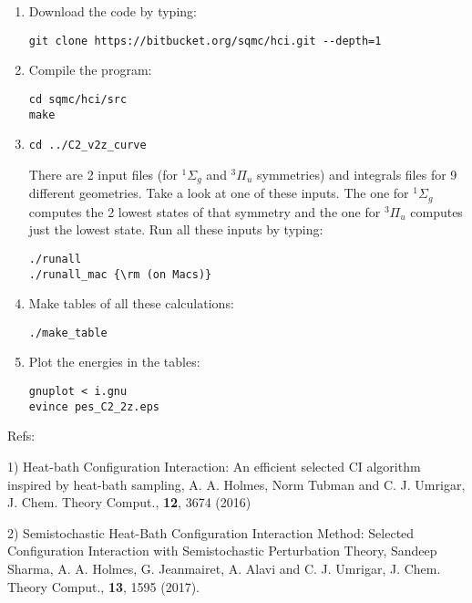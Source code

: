 \documentclass[12pt,aps,prb,groupedaddress,amsmath,amssymb]{revtex4-1}
\begin{document}
\begin{enumerate}
\item Download the code by typing:\vspace{-5mm}
\begin{verbatim}
git clone https://bitbucket.org/sqmc/hci.git --depth=1
\end{verbatim}
\item
Compile the program:\vspace{-5mm}
\begin{verbatim}
cd sqmc/hci/src
make
\end{verbatim}
\item
\begin{verbatim}
cd ../C2_v2z_curve
\end{verbatim}
There are 2 input files (for $^1\Sigma_g$ and $^3\Pi_u$ symmetries) and integrals files for 9 different geometries.  Take a look at one of these inputs.
The one for $^1\Sigma_g$ computes the 2 lowest states of that symmetry and the one for $^3\Pi_u$ computes just the lowest state.
Run all these inputs by typing:
\begin{verbatim}
./runall
./runall_mac {\rm (on Macs)}
\end{verbatim}
\item Make tables of all these calculations:\vspace{-5mm}
\begin{verbatim}
./make_table
\end{verbatim}
\item Plot the energies in the tables:\vspace{-5mm}
\begin{verbatim}
gnuplot < i.gnu
evince pes_C2_2z.eps
\end{verbatim}
\end{enumerate}

\vskip 9mm
Refs:
\small


1) Heat-bath Configuration Interaction: An efficient selected CI algorithm inspired by heat-bath sampling,
A. A. Holmes, Norm Tubman and C. J. Umrigar, J. Chem. Theory Comput., {\bf 12}, 3674 (2016)

2) Semistochastic Heat-Bath Configuration Interaction Method:
Selected Configuration Interaction with Semistochastic Perturbation Theory,
Sandeep Sharma, A. A. Holmes, G. Jeanmairet, A. Alavi and C. J. Umrigar, J. Chem. Theory Comput., {\bf 13}, 1595 (2017).
\end{document}

